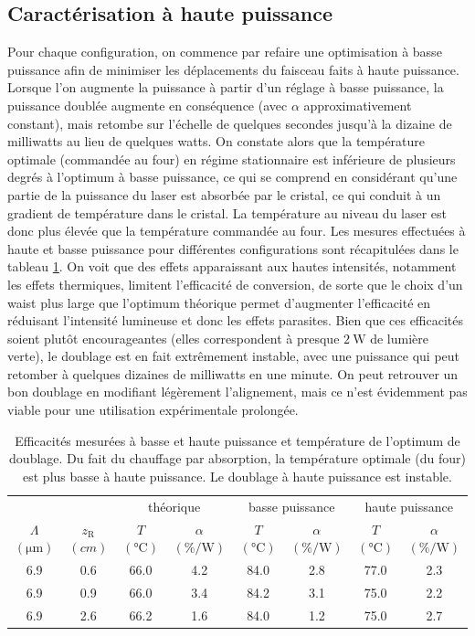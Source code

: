 \documentclass[11pt,a4paper]{article}
\newcommand{\ra}[1]{\renewcommand{\arraystretch}{#1}}
\newcommand{\zr}{z_\mathsc{R}}
\newcommand{\mathsc}[1]{\mathrm{\scriptscriptstyle {#1}}}
\begin{document}
\subsection{Caractérisation à haute puissance}
Pour chaque configuration, on commence par refaire une optimisation à basse puissance afin de minimiser les déplacements du faisceau faits à haute puissance.
Lorsque l'on augmente la puissance à partir d'un réglage à basse puissance, la puissance doublée augmente en conséquence (avec $\alpha$ approximativement constant), mais retombe sur l'échelle de quelques secondes jusqu'à la dizaine de milliwatts au lieu de quelques watts. On constate alors que la température optimale (commandée au four) en régime stationnaire est inférieure de plusieurs degrés à l'optimum à basse puissance, ce qui se comprend en considérant qu'une partie de la puissance du laser est absorbée par le cristal, ce qui conduit à un gradient de température dans le cristal. La température au niveau du laser est donc plus élevée que la température commandée au four. Les mesures effectuées à haute et basse puissance pour différentes configurations sont récapitulées dans le tableau \ref{table:mes}. On voit que des effets apparaissant aux hautes intensités, notamment les effets thermiques, limitent l'efficacité de conversion, de sorte que le choix d'un waist plus large que l'optimum théorique permet d'augmenter l'efficacité en réduisant l'intensité lumineuse et donc les effets parasites. Bien que ces efficacités soient plutôt encourageantes (elles correspondent à presque $\SI{2}{\watt}$ de lumière verte), le doublage est en fait extrêmement instable, avec une puissance qui peut retomber à quelques dizaines de milliwatts en une minute. On peut retrouver un bon doublage en modifiant légèrement l'alignement, mais ce n'est évidemment pas viable pour une utilisation expérimentale prolongée.

\begin{table}[htpb]
\centering
\ra{1.3}
\begin{tabular}{@{}cccccccc@{}} \toprule
 &  & \multicolumn{2}{c}{théorique} & \multicolumn{2}{c}{basse puissance} & \multicolumn{2}{c}{haute puissance} \\ 
 \cmidrule(r){3-4} \cmidrule(lr){5-6} \cmidrule(l){7-8} 
 $\Lambda$ $(\unit{\micro\meter})$ & $\zr$ $(\unit{cm})$ & $T$ $(\unit{\celsius})$ & $\alpha$ $(\unit{\percent\per\watt})$& $T$ $(\unit{\celsius})$ & $\alpha$ $(\unit{\percent\per\watt})$ & $T$ $(\unit{\celsius})$ & $\alpha$ $(\unit{\percent\per\watt})$   \\ \midrule
 6.9       & 0.6  & 66.0  & 4.2      & 84.0 & 2.8      & 77.0 & 2.3      \\
 6.9       & 0.9  & 66.0  & 3.4      & 84.2 & 3.1      & 75.0 & 2.2      \\
 6.9       & 2.6  & 66.2  & 1.6      & 84.0 & 1.2      & 75.0   & 2.7      \\ \bottomrule 
\end{tabular}
\caption{Efficacités mesurées à basse et haute puissance et température de l'optimum de doublage. \small Du fait du chauffage par absorption, la température optimale (du four) est plus basse à haute puissance. Le doublage à haute puissance est instable.} %
\label{table:mes}
\end{table}
\end{document}
